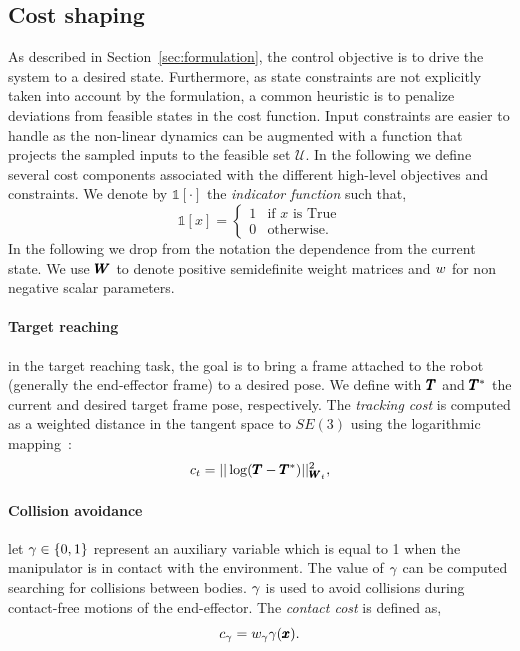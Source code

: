 \subsection{Cost shaping}
As described in Section~\ref{sec:formulation}, the control objective is to drive the system to a desired state. Furthermore, as state constraints are not explicitly taken into account by the formulation, a common heuristic is to penalize deviations from feasible states in the cost function. Input constraints are easier to handle as the non-linear dynamics can be augmented with a function that projects the sampled inputs to the feasible set $\mathcal{U}$. In the following we define several cost components associated with the different high-level objectives and constraints.
We denote by $\mathds{1}[\cdot]$ the \textit{indicator function} such that,
\begin{equation}
    \mathds{1}[x] = 
    \begin{cases}
    1 & \text{if } x \text{ is True} \\
    0 & \text{otherwise}.
    \end{cases}
\end{equation}
In the following we drop from the notation the dependence from the current state. We use $\pmb{W}_{}$ to denote positive semidefinite weight matrices and $w_{}$ for non negative scalar parameters. 

\paragraph{Target reaching} in the target reaching task, the goal is to bring a frame attached to the robot (generally the end-effector frame) to a desired pose. We define with $\pmb{T}$ and $\pmb{T}^*$ the current and desired target frame pose, respectively. The \textit{tracking cost} is computed as a weighted distance in the tangent space to $SE(3)$ using the logarithmic mapping~\cite{blanco2010tutorial}:
\begin{equation} \label{eq:tracking_cost}
     c_{t} = || \log(\pmb{T} - \pmb{T}^{*}) ||^2_{\pmb{W}_{t}},
 \end{equation}
 
 \paragraph{Collision avoidance} let $\gamma \in \{0, 1\}$ represent an auxiliary variable which is equal to 1 when the manipulator is in contact with the environment. The value of $\gamma$ can be computed searching for collisions between bodies. 
 $\gamma$ is used to avoid collisions during contact-free motions of the end-effector. 
 The \textit{contact cost} is defined as,
 \begin{equation}
     c_{\gamma}= w_{\gamma} \gamma(\pmb{x}).
 \end{equation}

